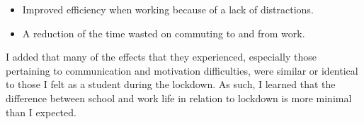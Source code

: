 \begin{itemize}
    \item Improved efficiency when working because of a lack of distractions.
    \item A reduction of the time wasted on commuting to and from work.
\end{itemize}

I added that many of the effects that they experienced, especially those
pertaining to communication and motivation difficulties, were similar or
identical to those I felt as a student during the lockdown. As such, I learned
that the difference between school and work life in relation to lockdown is more
minimal than I expected.
